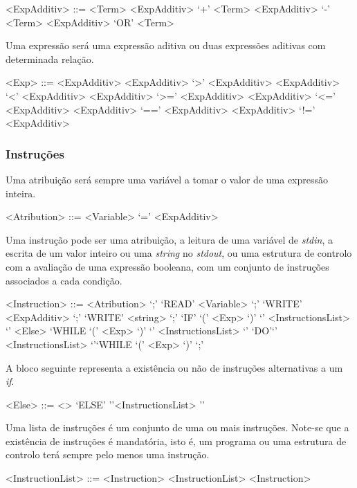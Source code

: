 \begin{grammar}
<ExpAdditiv> ::= <Term> 
\alt <ExpAdditiv> `+' <Term>
\alt <ExpAdditiv> `-' <Term> 
\alt <ExpAdditiv> `OR' <Term> 
\end{grammar}

Uma expressão será uma expressão aditiva ou duas expressões aditivas com
determinada relação.

\begin{grammar}
<Exp> ::= <ExpAdditiv>             
\alt  <ExpAdditiv> `>'  <ExpAdditiv> 
\alt  <ExpAdditiv> `<'  <ExpAdditiv> 
\alt  <ExpAdditiv> `>=' <ExpAdditiv> 
\alt  <ExpAdditiv> `<=' <ExpAdditiv> 
\alt  <ExpAdditiv> `==' <ExpAdditiv> 
\alt  <ExpAdditiv> `!=' <ExpAdditiv> 
\end{grammar}


\subsubsection{Instruções}
\label{subsec:subsubsec:instrucoes:desenho}

Uma atribuição será sempre uma variável a tomar o valor de uma expressão
inteira.
\begin{grammar}
<Atribution> ::=  <Variable> `=' <ExpAdditiv> 
\end{grammar}


Uma instrução pode ser uma atribuição, a leitura de uma variável de
\emph{stdin}, a escrita de um valor inteiro ou uma \emph{string} no
\emph{stdout}, ou uma estrutura de controlo com a avaliação de uma expressão
booleana, com um conjunto de instruções associados a cada condição.

\begin{grammar}
<Instruction> ::= <Atribution> `;' 
\alt `READ'  <Variable> `;'
\alt `WRITE' <ExpAdditiv> `;'                      
\alt `WRITE' <string> `;'
\alt `IF' `(' <Exp> `)' `{' <InstructionsList> `}' <Else>
\alt `WHILE `(' <Exp> `)' `{' <InstructionsList> `}' 
\alt `DO'`{' <InstructionsList> `}'`WHILE `(' <Exp> `)' `;' 
\end{grammar}


A bloco seguinte representa a existência ou não de instruções alternativas a um
\emph{if}. 

\begin{grammar}
<Else> ::= <>
\alt `ELSE' '{'<InstructionsList> '}'
\end{grammar}

Uma lista de instruções é um conjunto de uma ou mais instruções. Note-se que
a existência de instruções é mandatória, isto é, um programa ou uma estrutura de
controlo terá sempre pelo menos uma instrução.

\begin{grammar}
<InstructionList> ::= <Instruction>
\alt <InstructionList> <Instruction>  
\end{grammar}











